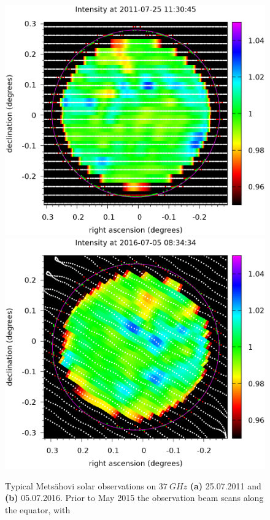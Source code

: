 \documentclass{aa}
\begin{document}
  \begin{figure}
  \centering
  \includegraphics[trim=0cm 3cm 0cm 1.2cm,clip=True,width=\columnwidth]{nea1311582408.png}
  \includegraphics[trim=0cm 0cm 0cm 1.2cm,clip=True,width=\columnwidth]{nea1467696874.png}
  \caption{
    Typical Mets\"ahovi solar observations on $\SI{37}{GHz}$ {\bf(a)}
    25.07.2011 and {\bf(b)} 05.07.2016.
    Prior to May 2015 the observation beam scans along the equator, with
}
\end{figure}
\end{document}
